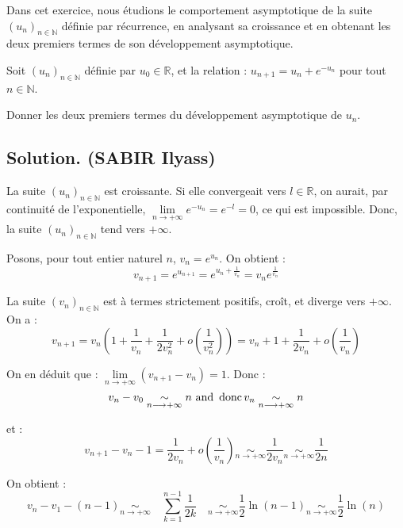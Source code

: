 Dans cet exercice, nous {\'e}tudions le comportement asymptotique de la suite
$(u_n)_{n \in \mathbb{N}}$ d{\'e}finie par r{\'e}currence, en analysant sa
croissance et en obtenant les deux premiers termes de son d{\'e}veloppement
asymptotique.
\begin{exercise}[]
Soit $(u_n)_{n \in \mathbb{N}}$ d{\'e}finie par $u_0 \in \mathbb{R}$, et la
relation : $u_{n + 1} = u_n + e^{- u_n}$ pour tout $n \in \mathbb{N}$.

Donner les deux premiers termes du d{\'e}veloppement asymptotique de $u_n$.

\end{exercise}

\subsection*{Solution. (SABIR Ilyass)}

La suite $(u_n)_{n \in \mathbb{N}}$ est croissante. Si elle convergeait vers
$l \in \mathbb{R}$, on aurait, par continuit{\'e} de l'exponentielle,
$\underset{n \longrightarrow + \infty}{\lim} e^{- u_n} = e^{- l} = 0$, ce qui
est impossible. Donc, la suite $(u_n)_{n \in \mathbb{N}}$ tend vers $+
\infty$.

Posons, pour tout entier naturel $n$, $v_n = e^{u_n}$. On obtient :
\[ v_{n + 1} = e^{u_{n + 1}} = e^{u_n + \frac{1}{v_n}} = v_n e^{\frac{1}{v_n}}
\]


La suite $(v_n)_{n \in \mathbb{N}}$ est {\`a} termes strictement positifs,
cro{\^i}t, et diverge vers $+ \infty$. On a :
\[ v_{n + 1} = v_n \left( 1 + \frac{1}{v_n} + \frac{1}{2 v^2_n} + o \left(
   \frac{1}{v^2_n} \right) \right) = v_n + 1 + \frac{1}{2 v _n} + o \left(
   \frac{1}{v_n} \right) \]


On en d{\'e}duit que : $\underset{n \longrightarrow + \infty}{\lim} (v_{n + 1}
- v_n) = 1$. Donc :
\[ v_n - v_0 \underset{n \longrightarrow + \infty}{\sim} n \text{ and }
   \operatorname{donc} v_n \underset{n \longrightarrow + \infty}{\sim} n \]


et :
\[ v_{n + 1} - v_n - 1 = \frac{1}{2 v _n} + o \left( \frac{1}{v _n} \right)
   \underset{n \longrightarrow + \infty}{\sim} \frac{1}{2 v_n} \underset{n
   \longrightarrow + \infty}{\sim} \frac{1}{2 n} \]


On obtient :
\[ v_n - v_1 - (n - 1) \underset{n \longrightarrow + \infty}{\sim} \quad
   \underset{k = 1}{\overset{n - 1}{\sum}} \frac{1}{2 k} \quad \underset{n
   \longrightarrow + \infty}{\sim} \frac{1}{2} \ln (n - 1) \underset{n
   \longrightarrow + \infty}{\sim} \frac{1}{2} \ln (n) \]


